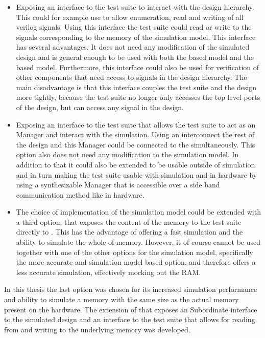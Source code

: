 \begin{itemize}
  \item Exposing an interface to the test suite to interact with the design hierarchy. This could for example use \VPI{} to allow enumeration, read and writing of all verilog signals. Using this interface the test suite could read or write to the signals corresponding to the memory of the \DRAM{} simulation model. This interface has several advantages. It does not need any modification of the simulated design and is general enough to be used with both the \AXIBRAMController{} based model and the \MIG{} based model. Furthermore, this interface could also be used for verification of other components that need access to signals in the design hierarchy. The main disadvantage is that this interface couples the test suite and the \FPGA{} design more tightly, because the test suite no longer only accesses the top level ports of the design, but can access any signal in the \FPGA{} design.
  \item Exposing an interface to the test suite that allows the test suite to act as an \AXI{} Manager and interact with the simulation. Using an \AXI{} interconnect the rest of the \FPGA{} design and this \AXI{} Manager could be connected to the \AXI{} \DRAM{} simultaneously. This option also does not need any modification to the \AXI{} \DRAM{} simulation model. In addition to that it could also be extended to be usable outside of simulation and in turn making the test suite usable with simulation and in hardware by using a synthesizable \AXI{} Manager that is accessible over a side band communication method like \JTAG{} in hardware.
  \item The choice of implementation of the \AXI{} \DRAM{} simulation model could be extended with a third option, that exposes the content of the memory to the test suite directly to \flange{}. This has the advantage of offering a fast simulation and the ability to simulate the whole \DDRSIZE{} of memory. However, it of course cannot be used together with one of the other options for the \AXI{} \DRAM{} simulation model, specifically the more accurate \MIG{} and \DDR{} simulation model based option, and therefore offers a less accurate simulation, effectively mocking out the RAM.
\end{itemize}
In this thesis the last option was chosen for its increased simulation performance and ability to simulate a memory with the same size as the actual memory present on the hardware. The \flangedram{} extension of \flange{} that exposes an \AXI{} Subordinate interface to the simulated \FPGA{} design and an interface to the test suite that allows for reading from and writing to the underlying memory was developed.
